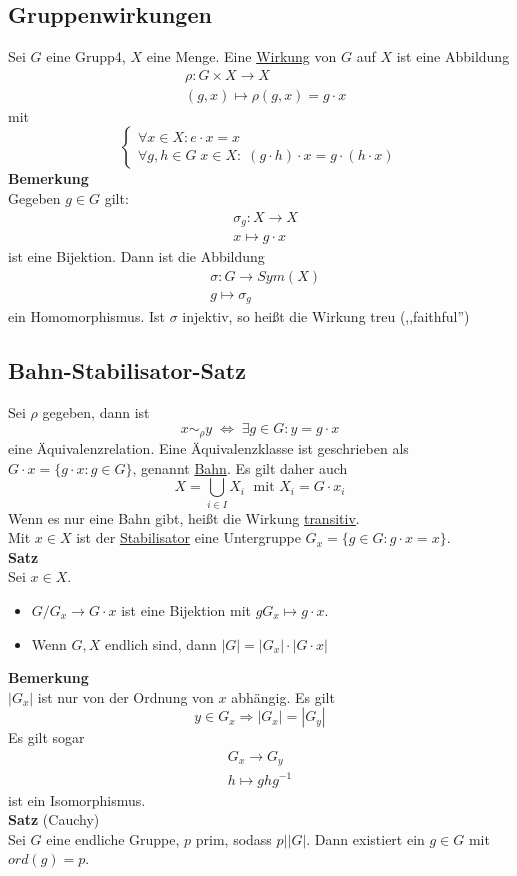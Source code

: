 \documentclass[a4paper, 12pt]{article}
\begin{document}
\subsection{Gruppenwirkungen}
Sei $G$ eine Grupp4, $X$ eine Menge. Eine \underline{Wirkung} von $G$ auf $X$ ist eine Abbildung \begin{eqnarray*}
	&\rho: G\times X \to X\\
	&(g,x) \mapsto \rho(g,x) = g\cdot x
\end{eqnarray*}
mit \[\begin{cases}
	\forall x \in X: e\cdot x = x\\
	\forall g,h \in G\; x\in X: \; (g\cdot h)\cdot x = g\cdot (h\cdot x)
\end{cases}\]
\textbf{Bemerkung}\\
Gegeben $g \in G$ gilt: \begin{eqnarray*}
	&\sigma_g: X \to X\\
	&x \mapsto g\cdot x
\end{eqnarray*} ist eine Bijektion.
Dann ist die Abbildung \begin{eqnarray*}
	&\sigma: G \to Sym(X)\\
	&g \mapsto \sigma_g
\end{eqnarray*} ein Homomorphismus. Ist $\sigma$ injektiv, so heißt die Wirkung treu (,,faithful'')
\subsection{Bahn-Stabilisator-Satz}
Sei $\rho$ gegeben, dann ist \[x\sim_\rho y \;\Leftrightarrow \; \exists g \in G: y=g\cdot x\] eine Äquivalenzrelation. Eine Äquivalenzklasse ist geschrieben als $G\cdot x = \{g\cdot x: g \in G\}$, genannt \underline{Bahn}. Es gilt daher auch \[X = \bigcup_{i \in I} X_i \;\text{ mit } X_i = G\cdot x_i\] Wenn es nur eine Bahn gibt, heißt die Wirkung \underline{transitiv}.\\
Mit $x \in X$ ist der \underline{Stabilisator} eine Untergruppe $G_x = \{g \in G: g\cdot x = x\}$.\\
\textbf{Satz}\\
Sei $x \in X$. \begin{itemize}
	\item $G/G_x \to G\cdot x$ ist eine Bijektion mit $gG_x \mapsto g\cdot x$.
	\item Wenn $G,X$ endlich sind, dann $\left|G\right| = \left|G_x\right|\cdot \left|G\cdot x\right|$
\end{itemize}
\textbf{Bemerkung}\\
$\left|G_x\right|$ ist nur von der Ordnung von $x$ abhängig. Es gilt \[y \in G_x \Rightarrow \left|G_x\right| = \left|G_y\right|\]
Es gilt sogar \begin{eqnarray*}
	G_x \to G_y\\
	h \mapsto ghg^{-1}
\end{eqnarray*} ist ein Isomorphismus.\\
\textbf{Satz} (Cauchy)\\
Sei $G$ eine endliche Gruppe, $p$ prim, sodass $p | \left|G\right|$. Dann existiert ein $g \in G$ mit $ord(g) = p$.
\end{document}

